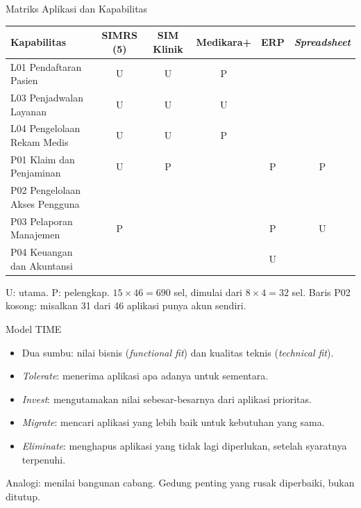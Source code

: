 \documentclass[aspectratio=169, table, 12pt]{beamer}
\begin{document}
\begin{frame}{{\Large Matriks Aplikasi dan Kapabilitas}}
  \footnotesize
  \begin{tabularx}{\textwidth}{>{\raggedright\arraybackslash}Xccccc}
    \hline
    \textbf{Kapabilitas} & \textbf{SIMRS (5)} & \textbf{SIM Klinik} & \textbf{Medikara+} & \textbf{ERP} & \textbf{\textit{Spreadsheet}} \\
    \hline
    L01 Pendaftaran Pasien & U & U & P & & \\
    \hline
    L03 Penjadwalan Layanan & U & U & U & & \\
    \hline
    L04 Pengelolaan Rekam Medis & U & U & P & & \\
    \hline
    P01 Klaim dan Penjaminan & U & P & & P & P \\
    \hline
    P02 Pengelolaan Akses Pengguna & & & & & \\
    \hline
    P03 Pelaporan Manajemen & P & & & P & U \\
    \hline
    P04 Keuangan dan Akuntansi & & & & U & \\
    \hline
  \end{tabularx}

  \vspace{6pt}
  \small U: utama. P: pelengkap. $15 \times 46 = 690$ sel, dimulai dari $8 \times 4 = 32$ sel. Baris P02
  kosong: misalkan 31 dari 46 aplikasi punya akun sendiri.
\end{frame}

\begin{frame}{{\Large Model TIME}}
  \vspace{10pt}
  \begin{itemize}
    \item Dua sumbu: nilai bisnis (\textit{functional fit}) dan kualitas teknis (\textit{technical fit}).
    \item \textit{Tolerate}: menerima aplikasi apa adanya untuk sementara.
    \item \textit{Invest}: mengutamakan nilai sebesar-besarnya dari aplikasi prioritas.
    \item \textit{Migrate}: mencari aplikasi yang lebih baik untuk kebutuhan yang sama.
    \item \textit{Eliminate}: menghapus aplikasi yang tidak lagi diperlukan, setelah syaratnya terpenuhi.
  \end{itemize}
  \vspace{6pt}
  {\small Analogi: menilai bangunan cabang. Gedung penting yang rusak diperbaiki, bukan ditutup.}
\end{frame}
\end{document}
